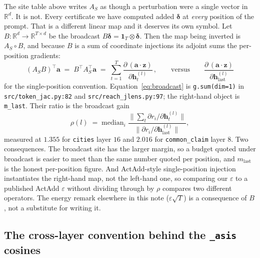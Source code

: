 \documentclass[11pt]{article}
\newcommand{\R}{\mathbb{R}}
\newcommand{\vh}{\bm{h}}
\newcommand{\vz}{\bm{z}}
\newcommand{\va}{\bm{a}}
\newcommand{\vd}{\bm{\delta}}
\begin{document}
The site table above writes $A_S$ as though a perturbation were a single vector in $\R^d$. It is
not. Every certificate we have computed added $\vd$ at \emph{every} position of the
prompt. That is a different linear map and it deserves its own symbol. Let
$B:\R^d \to \R^{T\times d}$ be the broadcast $B\vd = \bm 1_T \otimes \vd$. Then the map
being inverted is $A_S \circ B$, and because $B$ is a sum of coordinate injections its
adjoint sums the per-position gradients:
\begin{equation}\label{eq:broadcast}
  (A_S B)^{\!\top} \va \;=\; B^{\!\top} A_S^{\!\top}\va
  \;=\; \sum_{t=1}^{T} \frac{\partial\, (\va\cdot\vz)}{\partial \vh^{(l)}_t}\,,
  \qquad\text{versus}\qquad
  \frac{\partial\,(\va\cdot\vz)}{\partial \vh^{(l)}_{\mathrm{last}}}
\end{equation}
for the single-position convention. Equation~\eqref{eq:broadcast} is
\texttt{g.sum(dim=1)} in \texttt{src/token\_jac.py:82} and
\texttt{src/reach\_jlens.py:97}; the right-hand object is \texttt{m\_last}. Their ratio
is the broadcast gain
\begin{equation}\label{eq:bgain}
  \rho(l) \;=\; \mathrm{median}_i\;
  \frac{\bigl\lVert \sum_t \partial r_i/\partial \vh^{(l)}_t \bigr\rVert}
       {\bigl\lVert \partial r_i/\partial \vh^{(l)}_{\mathrm{last}} \bigr\rVert},
\end{equation}
measured at $1.355$ for \texttt{cities} layer $16$ and $2.016$ for
\texttt{common\_claim} layer $8$. Two consequences. The broadcast site has the larger
margin, so a budget quoted under broadcast is easier to meet than the same number
quoted per position, and $m_{\mathrm{last}}$ is the honest per-position figure. And
ActAdd-style single-position injection instantiates the right-hand map, not the
left-hand one, so comparing our $\varepsilon$ to a published ActAdd $\varepsilon$
without dividing through by $\rho$ compares two different operators. The energy remark
elsewhere in this note ($\varepsilon\sqrt T$) is a consequence of $B$, not a substitute
for writing it.

\subsection{The cross-layer convention behind the \texttt{\_asis} cosines}
\label{sec:asis}
\end{document}
